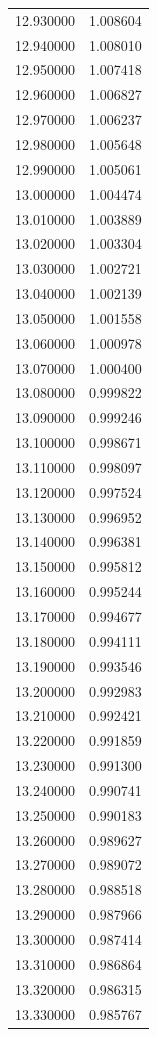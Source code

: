 \begin{tabular}{rr}
12.930000 & 1.008604 \\
12.940000 & 1.008010 \\
12.950000 & 1.007418 \\
12.960000 & 1.006827 \\
12.970000 & 1.006237 \\
12.980000 & 1.005648 \\
12.990000 & 1.005061 \\
13.000000 & 1.004474 \\
13.010000 & 1.003889 \\
13.020000 & 1.003304 \\
13.030000 & 1.002721 \\
13.040000 & 1.002139 \\
13.050000 & 1.001558 \\
13.060000 & 1.000978 \\
13.070000 & 1.000400 \\
13.080000 & 0.999822 \\
13.090000 & 0.999246 \\
13.100000 & 0.998671 \\
13.110000 & 0.998097 \\
13.120000 & 0.997524 \\
13.130000 & 0.996952 \\
13.140000 & 0.996381 \\
13.150000 & 0.995812 \\
13.160000 & 0.995244 \\
13.170000 & 0.994677 \\
13.180000 & 0.994111 \\
13.190000 & 0.993546 \\
13.200000 & 0.992983 \\
13.210000 & 0.992421 \\
13.220000 & 0.991859 \\
13.230000 & 0.991300 \\
13.240000 & 0.990741 \\
13.250000 & 0.990183 \\
13.260000 & 0.989627 \\
13.270000 & 0.989072 \\
13.280000 & 0.988518 \\
13.290000 & 0.987966 \\
13.300000 & 0.987414 \\
13.310000 & 0.986864 \\
13.320000 & 0.986315 \\
13.330000 & 0.985767 \\

\end{tabular}
